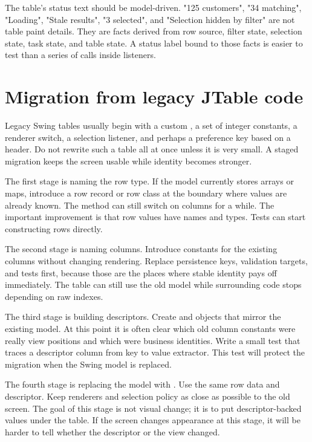The table's status text should be model-driven. "125 customers", "34 matching",
"Loading", "Stale results", "3 selected", and "Selection hidden by filter" are
not table paint details. They are facts derived from row source, filter state,
selection state, task state, and table state. A status label bound to those
facts is easier to test than a series of  calls inside listeners.

\section{Migration from legacy JTable code}

Legacy Swing tables usually begin with a custom , a
set of integer constants, a renderer switch, a selection listener, and perhaps
a preference key based on a header. Do not rewrite such a table all at once
unless it is very small. A staged migration keeps the screen usable while
identity becomes stronger.

The first stage is naming the row type. If the model currently stores arrays
or maps, introduce a row record or row class at the boundary where values are
already known. The  method can still switch on columns for a
while. The important improvement is that row values have names and types.
Tests can start constructing rows directly.

The second stage is naming columns. Introduce  constants for
the existing columns without changing rendering. Replace persistence keys,
validation targets, and tests first, because those are the places where stable
identity pays off immediately. The table can still use the old model while
surrounding code stops depending on raw indexes.

The third stage is building descriptors. Create  and
 objects that mirror the existing model. At this point it is often
clear which old column constants were really view positions and which were
business identities. Write a small test that traces a descriptor column from
key to value extractor. This test will protect the migration when the Swing
model is replaced.

The fourth stage is replacing the model with . Use
the same row data and descriptor. Keep renderers and selection policy as close
as possible to the old screen. The goal of this stage is not visual change; it
is to put descriptor-backed values under the table. If the screen changes
appearance at this stage, it will be harder to tell whether the descriptor or
the view changed.

